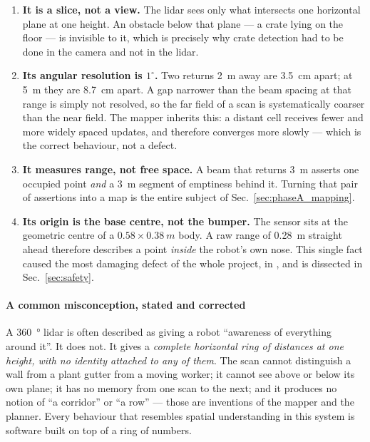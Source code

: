 \begin{enumerate}[leftmargin=*,itemsep=2pt,topsep=2pt]
  \item \textbf{It is a slice, not a view.} The lidar sees only what
        intersects one horizontal plane at one height. An obstacle below
        that plane --- a crate lying on the floor --- is invisible to it,
        which is precisely why crate detection had to be done in the
        camera and not in the lidar.
  \item \textbf{Its angular resolution is $1^\circ$.} Two returns
        \SI{2}{m} away are \SI{3.5}{cm} apart; at \SI{5}{m} they are
        \SI{8.7}{cm} apart. A gap narrower than the beam spacing at that
        range is simply not resolved, so the far field of a scan is
        systematically coarser than the near field. The mapper inherits
        this: a distant cell receives fewer and more widely spaced
        updates, and therefore converges more slowly --- which is the
        correct behaviour, not a defect.
  \item \textbf{It measures range, not free space.} A beam that returns
        \SI{3}{m} asserts one occupied point \emph{and} a \SI{3}{m}
        segment of emptiness behind it. Turning that pair of assertions
        into a map is the entire subject of
        Sec.~\ref{sec:phaseA_mapping}.
  \item \textbf{Its origin is the base centre, not the bumper.} The
        sensor sits at the geometric centre of a $0.58 \times
        \SI{0.38}{m}$ body. A raw range of \SI{0.28}{m} straight ahead
        therefore describes a point \emph{inside} the robot's own nose.
        This single fact caused the most damaging defect of the whole
        project, in \phaseB{}, and is dissected in
        Sec.~\ref{sec:safety}.
\end{enumerate}

\paragraph{A common misconception, stated and corrected}
A \SI{360}{\degree} lidar is often described as giving a robot
``awareness of everything around it''. It does not. It gives a
\emph{complete horizontal ring of distances at one height, with no
identity attached to any of them}. The scan cannot distinguish a wall
from a plant gutter from a moving worker; it cannot see above or below
its own plane; it has no memory from one scan to the next; and it
produces no notion of ``a corridor'' or ``a row'' --- those are
inventions of the mapper and the planner. Every behaviour that resembles
spatial understanding in this system is software built on top of a ring
of numbers.

